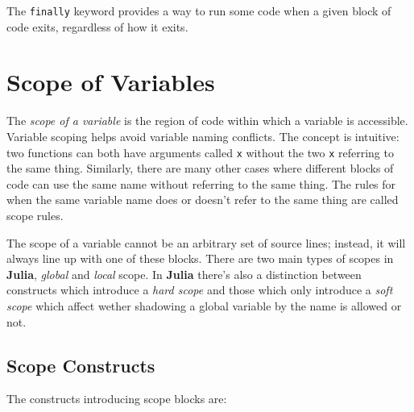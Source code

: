 \documentclass[
]{article}
\begin{document}
The \texttt{finally} keyword provides a way to run some code when a
given block of code exits, regardless of how it exits.

\newpage

\hypertarget{scope-of-variables}{%
\section{Scope of Variables}\label{scope-of-variables}}

The \emph{scope of a variable} is the region of code within which a
variable is accessible. Variable scoping helps avoid variable naming
conflicts. The concept is intuitive: two functions can both have
arguments called \texttt{x} without the two \texttt{x} referring to the
same thing. Similarly, there are many other cases where different blocks
of code can use the same name without referring to the same thing. The
rules for when the same variable name does or doesn't refer to the same
thing are called scope rules.

The scope of a variable cannot be an arbitrary set of source lines;
instead, it will always line up with one of these blocks. There are two
main types of scopes in \textbf{Julia}, \emph{global} and \emph{local}
scope. In \textbf{Julia} there's also a distinction between constructs
which introduce a \emph{hard scope} and those which only introduce a
\emph{soft scope} which affect wether shadowing a global variable by the
name is allowed or not.

\hypertarget{scope-constructs}{%
\subsection{Scope Constructs}\label{scope-constructs}}

The constructs introducing scope blocks are:
\end{document}
